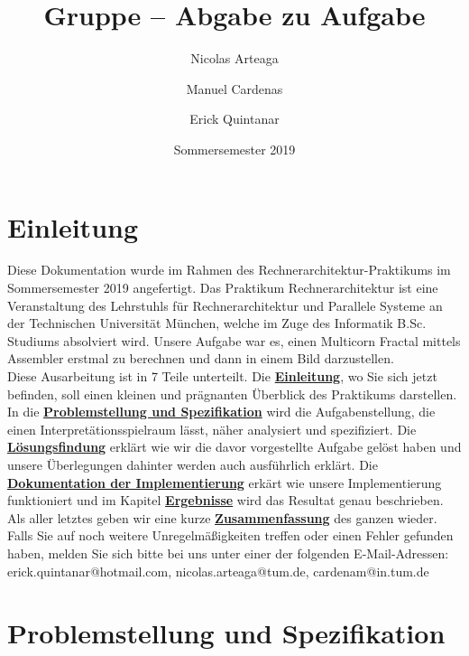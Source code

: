 \documentclass[course=erap]{aspdoc}
\author{Nicolas Arteaga \and Manuel Cardenas \and Erick Quintanar}
\date{Sommersemester 2019} %
\title{Gruppe \theGroup{} -- Abgabe zu Aufgabe \theNumber}
\begin{document}
\maketitle

\tableofcontents

\section{Einleitung}\label{section:einleitung}

Diese Dokumentation wurde im Rahmen des Rechnerarchitektur-Praktikums im Sommersemester 2019
angefertigt. Das Praktikum Rechnerarchitektur ist eine Veranstaltung des Lehrstuhls für Rechnerarchitektur und Parallele Systeme an der Technischen Universität München, welche im Zuge des Informatik B.Sc. Studiums absolviert wird. Unsere Aufgabe war es, einen Multicorn Fractal mittels Assembler erstmal zu berechnen und dann in einem Bild darzustellen. \\

Diese Ausarbeitung ist in 7 Teile unterteilt. Die \hyperref[section:einleitung]{\textbf{Einleitung}}, wo Sie sich jetzt befinden, soll einen kleinen und pr\"agnanten \"Uberblick des Praktikums darstellen. In die \hyperref[section:problemstellung]{\textbf{Problemstellung und Spezifikation}} wird die Aufgabenstellung, die einen Interpretätionsspielraum l\"asst, n\"aher analysiert und spezifiziert. Die \hyperref[section:losungsfindung]{\textbf{L\"osungsfindung}} erkl\"art wie wir die davor vorgestellte Aufgabe gel\"ost haben und unsere \"Uberlegungen dahinter werden auch ausf\"uhrlich erkl\"art. Die \hyperref[section:dokumentation]{\textbf{Dokumentation der Implementierung}} erk\"art wie unsere Implementierung funktioniert und im Kapitel \hyperref[section:ergebnsse]{\textbf{Ergebnisse}} wird das Resultat genau beschrieben. Als aller letztes geben wir eine kurze \hyperref[section:zusammenfassung]{\textbf{Zusammenfassung}} des ganzen wieder. \\

Falls Sie auf noch weitere Unregelmäßigkeiten treffen oder einen Fehler gefunden haben, melden Sie sich bitte bei uns unter einer der folgenden E-Mail-Adressen: \\
erick.quintanar@hotmail.com, nicolas.arteaga@tum.de, cardenam@in.tum.de

\section{Problemstellung und Spezifikation}\label{section:problemstellung}
\end{document}
